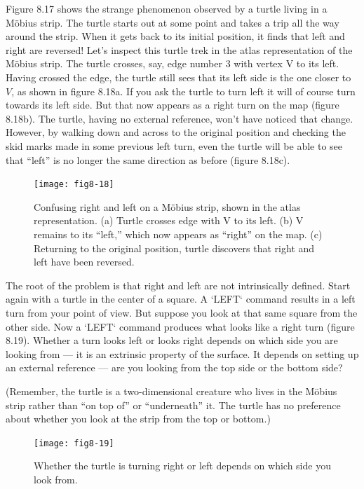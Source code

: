 \documentclass{book}
\begin{document}
Figure 8.17 shows the strange phenomenon observed by a turtle living
in a M\"obius strip. The turtle starts out at some point and takes a trip
all the way around the strip. When it gets back to its initial position,
it finds that left and right are reversed! Let's inspect this turtle trek
in the atlas representation of the M\"obius strip. The turtle crosses, say,
edge number 3 with vertex V to its left. Having crossed the edge, the
turtle still sees that its left side is the one closer to $V$, as shown in figure
8.18a. If you ask the turtle to turn left it will of course turn towards
its left side. But that now appears as a right turn on the map (figure
8.18b). The turtle, having no external reference, won't have noticed that
change. However, by walking down and across to the original position
and checking the skid marks made in some previous left turn, even the
turtle will be able to see that ``left'' is no longer the same direction as
before (figure 8.18c).

\begin{figure}
\begin{center}
\texttt{[image: fig8-18]}
\caption{Confusing right and left on a M\"obius strip, shown in the atlas representation. (a) Turtle crosses edge with V to its left. (b) V remains to its ``left,'' which now appears as ``right'' on the map. (c) Returning to the original position, turtle discovers that right and left have been reversed.}
\end{center}
\end{figure}

The root of the problem is that right and left are not intrinsically
defined. Start again with a turtle in the center of a square. A \textsc{`LEFT`}
command results in a left turn from your point of view. But suppose
you look at that same square from the other side. Now a \textsc{`LEFT`} command
produces what looks like a right turn (figure 8.19). Whether a turn looks
left or looks right depends on which side you are looking from --- it is
an extrinsic property of the surface. It depends on setting up an external reference --- are you looking from the top side or the bottom side?

(Remember, the turtle is a two-dimensional creature who lives in the
M\"obius strip rather than ``on top of'' or ``underneath'' it. The turtle
has no preference about whether you look at the strip from the top or
bottom.)

\begin{figure}
\begin{center}
\texttt{[image: fig8-19]}
\caption{Whether the turtle is turning right or left depends on which side you look from.}
\end{center}
\end{figure}
\end{document}
